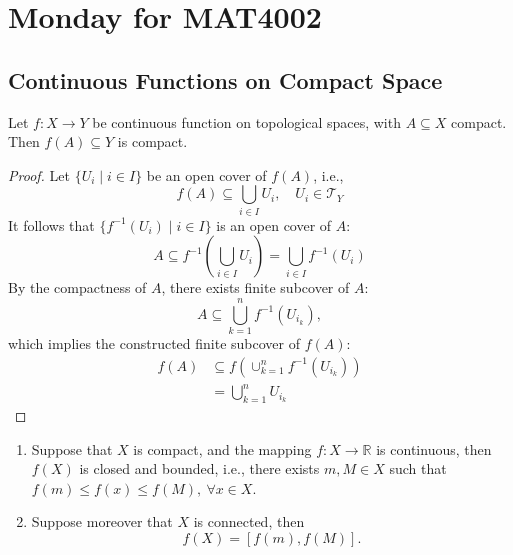 \section{Monday for MAT4002}
\subsection{Continuous Functions on Compact Space}

\begin{proposition}\label{pro:5:3}
Let $f:X\to Y$ be continuous function on topological spaces, with $A\subseteq X$ compact. Then $f(A)\subseteq Y$ is compact.
\end{proposition}
\begin{proof}
Let $\{U_i\mid i\in I\}$ be an open cover of $f(A)$, i.e.,
\[
f(A)\subseteq\bigcup_{i\in I}U_i,\quad U_i\in\mathcal{T}_Y
\]
It follows that $\{f^{-1}(U_i)\mid i\in I\}$ is an open cover of $A$:
\[
A\subseteq f^{-1}\left(\bigcup_{i\in I}U_i\right)=\bigcup_{i\in I}f^{-1}(U_i)
\]
By the compactness of $A$, there exists finite subcover of $A$:
\[
A\subseteq\bigcup_{k=1}^nf^{-1}(U_{i_k}),
\]
which implies the constructed finite subcover of $f(A)$:
\begin{align*}
f(A)&\subseteq f(\cup_{k=1}^nf^{-1}(U_{i_k}))\\
&=\bigcup_{k=1}^nU_{i_k}
\end{align*}
\end{proof}

\begin{corollary}
\begin{enumerate}
\item
Suppose that $X$ is compact, and the mapping $f:X\to\mathbb{R}$ is continuous, then $f(X)$ is closed and bounded, i.e., there exists $m,M\in X$ such that $f(m)\le f(x)\le f(M),\ \forall x\in X$.
\item
Suppose moreover that $X$ is connected, then
\[
f(X)=[f(m),f(M)].
\]
\end{enumerate}
\end{corollary}

